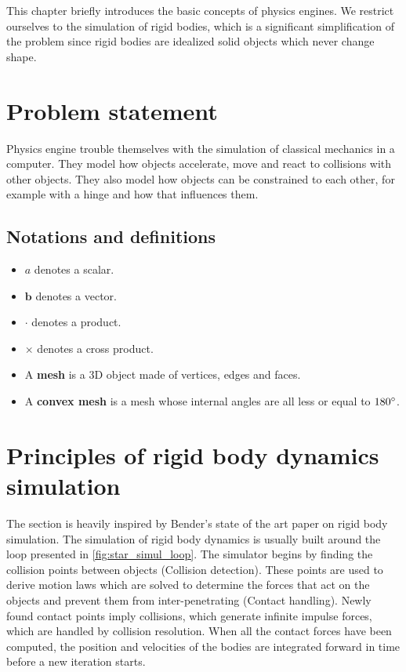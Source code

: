 This chapter briefly introduces the basic concepts of physics engines. We restrict ourselves to the simulation of rigid bodies, which is a significant simplification of the problem since rigid bodies are idealized solid objects which never change shape.

\section{Problem statement}
Physics engine trouble themselves with the simulation of classical mechanics in a computer. They model how objects accelerate, move and react to collisions with other objects. They also model how objects can be constrained to each other, for example with a hinge and how that influences them.

\subsection{Notations and definitions}
\begin{itemize}
\item $a$ denotes a scalar.
\item $\mathbf{b}$ denotes a vector.
\item $\cdot$ denotes a product.
\item $\times$ denotes a cross product.
\item A \textbf{mesh} is a 3D object made of vertices, edges and faces. 
\item A \textbf{convex mesh} is a mesh whose internal angles are all less or equal to $180\degree$.
\end{itemize}

\section{Principles of rigid body dynamics simulation}
The section is heavily inspired by Bender's \cite{bender2014interactive} state of the art paper on rigid body simulation. The simulation of rigid body dynamics is usually built around the loop presented in \cref{fig:star_simul_loop}. The simulator begins by finding the collision points between objects (Collision detection). These points are used to derive motion laws which are solved to determine the forces that act on the objects and prevent them from inter-penetrating (Contact handling). Newly found contact points imply collisions, which generate infinite impulse forces, which are handled by collision resolution. When all the contact forces have been computed, the position and velocities of the bodies are integrated forward in time before a new iteration starts.

